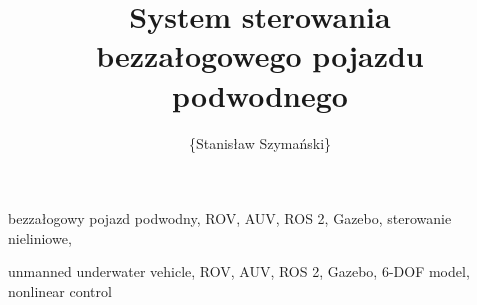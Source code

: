 \documentclass[
    bindingoffset=5mm,  %
    footnoteindent=3mm, %
    hyphenation=true    %
]{src/wut-thesis}
\begin{document}
\title{
    System sterowania \\bezzałogowego pojazdu podwodnego
}
\author{\{Stanisław Szymański\}}
\date{\the\year}
\maketitle

\cleardoublepage %
\abstract 
\keywords bezzałogowy pojazd podwodny, ROV, AUV, ROS 2, Gazebo, sterowanie nieliniowe,

\clearpage
\secondabstract  %
\secondkeywords unmanned underwater vehicle, ROV, AUV, ROS 2, Gazebo, 6-DOF model, nonlinear control

\pagestyle{plain}

\cleardoublepage %
\tableofcontents

\cleardoublepage %
\pagestyle{headings}






\cleardoublepage %
\printbibliography
\clearpage
\end{document}
